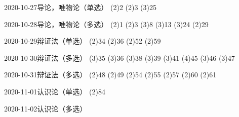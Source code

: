 \documentclass{ctexart}
\begin{document}
\begin{sdpolitics}{2020-10-27}{导论，唯物论（单选）}
  \addto[2020-10-29](2){2}
  \addto[2020-10-31](2){3}
  \addto[2020-10-31](3){25}
\end{sdpolitics}

\begin{sdpolitics}{2020-10-28}{导论，唯物论（多选）}
  \addto[2020-10-30](2){1}
  \addto[2020-10-30](2){3}
  \addto[2020-11-01](3){8}
  \addto[2020-11-01](3){13}
  \addto[2020-11-01](3){24}
  \addto[2020-10-30](2){29}
\end{sdpolitics}

\begin{sdpolitics}{2020-10-29}{辩证法（单选）}
  \addto[2020-10-31](2){34}
  \addto[2020-10-31](2){36}
  \addto[2020-11-02](2){52}
  \addto[2020-10-31](2){59}
\end{sdpolitics}

\begin{sdpolitics}{2020-10-30}{辩证法（多选）}
  \addto[2020-11-01](3){35}
  \addto[2020-11-01](3){36}
  \addto[2020-11-01](3){38}
  \addto[2020-11-01](3){39}
  \addto[2020-11-01](3){41}
  \addto[2020-11-03](4){45}
  \addto[2020-11-01](3){46}
  \addto[2020-11-01](3){47}
\end{sdpolitics}

\begin{sdpolitics}{2020-10-31}{辩证法（多选）}
  \addto[2020-11-02](2){48}
  \addto[2020-11-02](2){49}
  \addto[2020-11-02](2){54}
  \addto[2020-11-02](2){55}
  \addto[2020-11-02](2){57}
  \addto[2020-11-02](2){60}
  \addto[2020-11-02](2){61}
\end{sdpolitics}

\begin{sdpolitics}{2020-11-01}{认识论（单选）}
  \addto[2020-11-03](2){84}
\end{sdpolitics}

\begin{sdpolitics}{2020-11-02}{认识论（多选）}
\end{sdpolitics}
\end{document}

